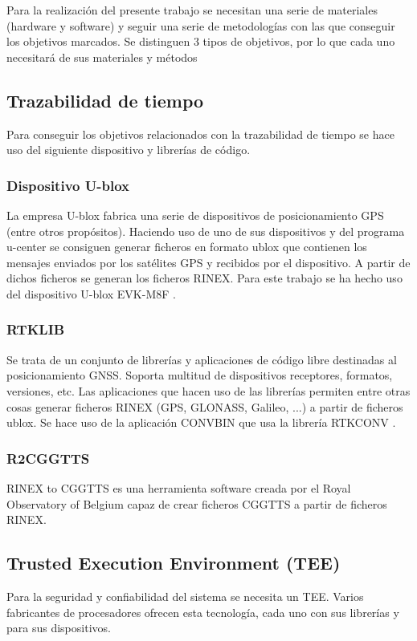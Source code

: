 Para la realización del presente trabajo se necesitan una serie de materiales (hardware y software) y seguir una serie de metodologías con las que conseguir los objetivos marcados. Se distinguen 3 tipos de objetivos, por lo que cada uno necesitará de sus materiales y métodos\newline

\subsection{Trazabilidad de tiempo}
Para conseguir los objetivos relacionados con la trazabilidad de tiempo se hace uso del siguiente dispositivo y librerías de código.

\subsubsection{Dispositivo U-blox}
La empresa U-blox fabrica una serie de dispositivos de posicionamiento GPS (entre otros propósitos). Haciendo uso de uno de sus dispositivos y del programa u-center se consiguen generar ficheros en formato ublox que contienen los mensajes enviados por los satélites GPS y recibidos por el dispositivo. A partir de dichos ficheros se generan los ficheros RINEX. Para este trabajo se ha hecho uso del dispositivo U-blox EVK-M8F \cite{ublox}.

\subsubsection{RTKLIB}
Se trata de un conjunto de librerías y aplicaciones de código libre destinadas al posicionamiento GNSS. Soporta multitud de dispositivos receptores, formatos, versiones, etc. Las aplicaciones que hacen uso de las librerías permiten entre otras cosas generar ficheros RINEX (GPS, GLONASS, Galileo, ...) a partir de ficheros ublox. Se hace uso de la aplicación CONVBIN que usa la librería RTKCONV \cite{rtklib}.

\subsubsection{R2CGGTTS}
RINEX to CGGTTS es una herramienta software \cite{ftpr2cggtts} creada por el Royal Observatory of Belgium capaz de crear ficheros CGGTTS a partir de ficheros RINEX.

\subsection{Trusted Execution Environment (TEE)}
Para la seguridad y confiabilidad del sistema se necesita un TEE. Varios fabricantes de procesadores ofrecen esta tecnología, cada uno con sus librerías y para sus dispositivos.


